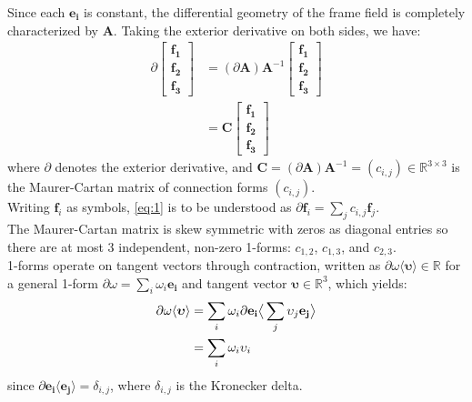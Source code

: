 Since each $\mathbf{e_i}$ is constant, the differential geometry of the frame field is completely characterized by $\mathbf{A}$. Taking the exterior derivative on both sides, we have:
\begin{equation} \label{eq:1}
\begin{split}
    \partial \begin{bmatrix}
                \mathbf{f_1} \\
                \mathbf{f_2} \\
                \mathbf{f_3}
            \end{bmatrix} &= (\partial \mathbf{A})\mathbf{A}^{-1}  \begin{bmatrix}
                \mathbf{f_1} \\
                \mathbf{f_2} \\
                \mathbf{f_3}
            \end{bmatrix} \\
            &= \mathbf{C}
            \begin{bmatrix}
                \mathbf{f_1} \\
                \mathbf{f_2} \\
                \mathbf{f_3}
            \end{bmatrix}
\end{split}
\end{equation}
where $\partial$ denotes the exterior derivative, and $\mathbf{C} = (\partial \mathbf{A}) \mathbf{A}^{-1} = (c_{i,j}) \in \mathbb{R}^{3 \times 3}$ is the Maurer-Cartan matrix of connection forms $(c_{i,j})$. \\
Writing $\mathbf{f}_i$ as symbols, \ref{eq:1} is to be understood as $\partial \mathbf{f}_i = \sum_j{c_{i,j}\mathbf{f}_j}$. \\
The Maurer-Cartan matrix is skew symmetric with zeros as diagonal entries so there are at most 3 independent, non-zero 1-forms: $c_{1,2}$, $c_{1,3}$, and $c_{2,3}$. \\
1-forms operate on tangent vectors through contraction, written as $\partial \omega \langle \boldsymbol{\upsilon} \rangle \in \mathbb{R}$ for a general 1-form $\partial \omega = \sum_i{\omega_i \mathbf{e_i}}$ and tangent vector $\boldsymbol{\upsilon} \in \mathbb{R}^3$, which yields:
\begin{equation}
\begin{split}
    \partial \omega \langle \boldsymbol{\upsilon} \rangle &= \sum_i{\omega_i \partial \mathbf{e_i}} \big{\langle} \sum_j{\upsilon_j \mathbf{e_j}} \big{\rangle} \\
    &= \sum_i{\omega_i \upsilon_i}
\end{split}
\end{equation} since $\partial \mathbf{e_i} \langle \mathbf{e_j} \rangle = \delta_{i,j}$, where $\delta_{i,j}$ is the Kronecker delta. \\
